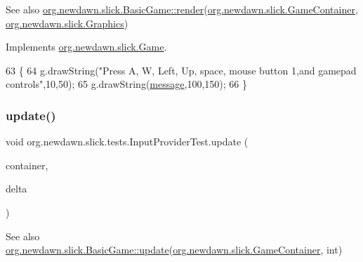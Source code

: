 \begin{DoxySeeAlso}{See also}
\mbox{\hyperlink{interfaceorg_1_1newdawn_1_1slick_1_1_game_af1a4670d43eb3ba04dfcf55ab1975b64}{org.\+newdawn.\+slick.\+Basic\+Game\+::render}}(\mbox{\hyperlink{classorg_1_1newdawn_1_1slick_1_1_game_container}{org.\+newdawn.\+slick.\+Game\+Container}}, \mbox{\hyperlink{classorg_1_1newdawn_1_1slick_1_1_graphics}{org.\+newdawn.\+slick.\+Graphics}}) 
\end{DoxySeeAlso}


Implements \mbox{\hyperlink{interfaceorg_1_1newdawn_1_1slick_1_1_game_af1a4670d43eb3ba04dfcf55ab1975b64}{org.\+newdawn.\+slick.\+Game}}.


\begin{DoxyCode}
63                                                             \{
64         g.drawString(\textcolor{stringliteral}{"Press A, W, Left, Up, space, mouse button 1,and gamepad controls"},10,50);
65         g.drawString(\mbox{\hyperlink{classorg_1_1newdawn_1_1slick_1_1tests_1_1_input_provider_test_a730fb6709b68daac2561204c3ab0e7fc}{message}},100,150);
66     \}
\end{DoxyCode}
\mbox{\label{classorg_1_1newdawn_1_1slick_1_1tests_1_1_input_provider_test_adda44b955459185b6cb6f61211f23b72}} 
\subsubsection{\texorpdfstring{update()}{update()}}
{\footnotesize\ttfamily void org.\+newdawn.\+slick.\+tests.\+Input\+Provider\+Test.\+update (\begin{DoxyParamCaption}\item[{\mbox{\hyperlink{classorg_1_1newdawn_1_1slick_1_1_game_container}{Game\+Container}}}]{container,  }\item[{int}]{delta }\end{DoxyParamCaption})\hspace{0.3cm}{\ttfamily [inline]}}

\begin{DoxySeeAlso}{See also}
\mbox{\hyperlink{classorg_1_1newdawn_1_1slick_1_1_basic_game_acfe6fa05aef83bff1631af91a3e4bd20}{org.\+newdawn.\+slick.\+Basic\+Game\+::update}}(\mbox{\hyperlink{classorg_1_1newdawn_1_1slick_1_1_game_container}{org.\+newdawn.\+slick.\+Game\+Container}}, int) 
\end{DoxySeeAlso}


